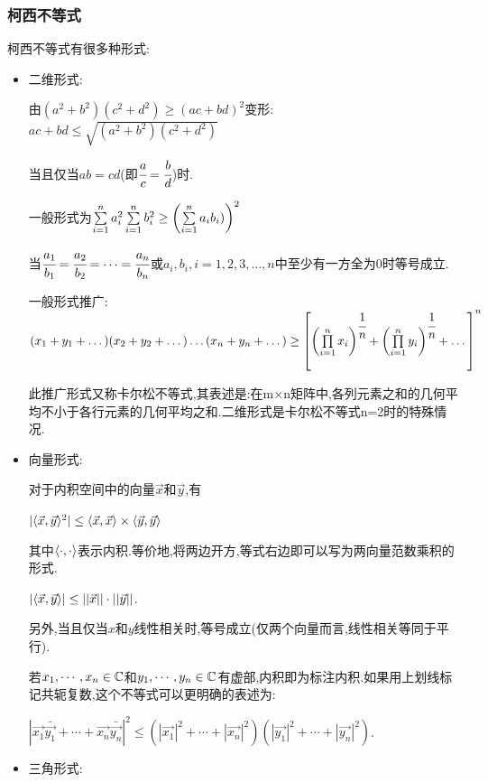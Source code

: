 {{\subsubsection{柯西不等式}{
    柯西不等式有很多种形式:
    \begin{itemize}
        \item {
              二维形式:

              由$(a^2 + b^2)(c^2 + d^2)\geq(ac + bd)^2$变形:$ac + bd \leq \sqrt{(a^2 + b^2)(c^2 + d^2)}$

              当且仅当$ab = cd$(即$\cfrac{a}{c} = \cfrac{b}{d}$)时.

              一般形式为$\upDownSum{n}{i = 1}a_i^2\upDownSum{n}{i = 1}b_i^2\geq\bigCase{\upDownSum{n}{i = 1}a_ib_i)}^2$

              当$\cfrac{a_1}{b_1} = \cfrac{a_2}{b_2} = \dots = \cfrac{a_n}{b_n}$或$a_i,b_i,i = 1,2,3,\dots,n$中至少有一方全为$0$时等号成立.

              一般形式推广:$(x_1 + y_1 + \dots)(x_2 + y_2 + \dots)\dots(x_n + y_n + \dots) \geq \left[\bigCase{\upDownProd{n}{i = 1}x_i}^{\cfrac{1}{n}} + \bigCase{\upDownProd{n}{i = 1}y_i}^{\cfrac{1}{n}} + \dots\right]^n$

              此推广形式又称卡尔松不等式,其表述是:在m×n矩阵中,各列元素之和的几何平均不小于各行元素的几何平均之和.二维形式是卡尔松不等式n=2时的特殊情况.
              }
        \item {
              向量形式:

              对于内积空间中的向量$\vec{x}$和$\vec{y}$,有

              $|\innerProduct{\vec{x}}{\vec{y}}^2| \leq \innerProduct{\vec{x}}{\vec{x}} \times \innerProduct{\vec{y}}{\vec{y}}$

              其中$\innerProduct{\cdot}{\cdot}$表示内积.等价地,将两边开方,等式右边即可以写为两向量范数乘积的形式.

              $|\innerProduct{\vec{x}}{\vec{y}}| \leq ||\vec{x}||\cdot||\vec{y}||$.

              另外,当且仅当$x$和$y$线性相关时,等号成立(仅两个向量而言,线性相关等同于平行).

              若$x_1,\dotsm,x_n \in \mathConstant$和$y_1,\dotsm,y_n \in \mathConstant$有虚部,内积即为标注内积.如果用上划线标记共轭复数,这个不等式可以更明确的表述为:

              $|\vec{x_1}\bar{\vec{y_1}} + \dotsm + \vec{x_n}\bar{\vec{y_n}}|^2\leq (|\vec{x_1}|^2 + \dotsm + |\vec{x_n}|^2)(|\vec{y_1}|^2 + \dotsm + |\vec{y_n}|^2)$.
              }
        \item {
              三角形式:

}
\end{itemize}}}}

